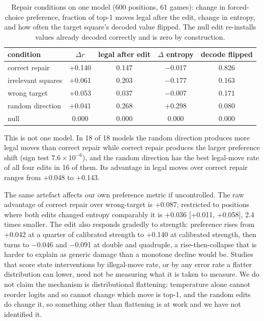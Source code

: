 \documentclass[11pt]{article}
\begin{document}
\begin{table}[t]
\centering\small
\caption{Repair conditions on one model (600 positions, 61
games): change in forced-choice preference, fraction of top-1 moves legal after
the edit, change in entropy, and how often the target square's decoded value
flipped. The null edit re-installs values already decoded correctly and is zero by
construction.}
\label{tab:inversion}
\begin{tabular}{lcccc}
\toprule
condition & $\Delta r$ & legal after edit & $\Delta$ entropy & decode flipped \\
\midrule
correct repair   & +0.140 & 0.147 & $-$0.017 & 0.826 \\
irrelevant squares & +0.061   & 0.203     & $-$0.177     & 0.163 \\
wrong target     & +0.053   & 0.037   & $-$0.007   & 0.171 \\
random direction & +0.041    & 0.268    & +0.298    & 0.080 \\
null             & 0.000    & 0.000    & 0.000    & 0.000 \\
\bottomrule
\end{tabular}
\end{table}

This is not one model. In 18 of 18 models the random
direction produces more legal moves than correct repair while correct repair
produces the larger preference shift (sign test $7.6\times10^{-6}$), and the random
direction has the best legal-move rate of all four edits in 16 of
them.
Its advantage in legal moves over correct repair ranges from +0.048 to
+0.143.

The same artefact affects our own preference metric if uncontrolled. The raw
advantage of correct repair over wrong-target is +0.087; restricted to
positions where both edits changed entropy comparably it is +0.036
[+0.011, +0.058], 2.4 times smaller. The
edit also responds gradedly to strength: preference rises from +0.042 at a
quarter of calibrated strength to +0.140 at calibrated strength, then
turns to $-$0.046 and $-$0.091 at double and quadruple, a
rise-then-collapse that is harder to explain as generic damage than a monotone
decline would be.
Studies that score state interventions by illegal-move rate, or by any error rate
a flatter distribution can lower, need not be measuring what it is taken to measure.
We do not claim the mechanism is distributional flattening: temperature alone cannot
reorder logits and so cannot change which move is top-1, and the random edits do
change it, so something other than flattening is at work and we have not identified
it.
\end{document}
